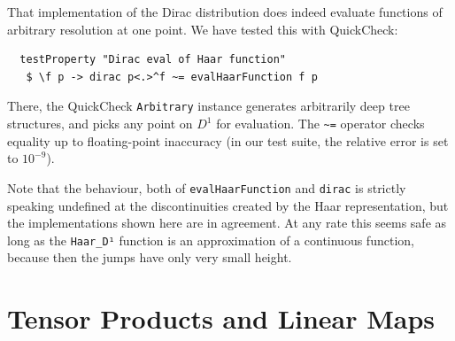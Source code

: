 \documentclass[sigplan,screen]{acmart}
\theoremstyle{acmplain}
\theoremstyle{acmdefinition}
\begin{document}
That implementation of the Dirac distribution does indeed evaluate functions of arbitrary resolution at one point. We have tested this with QuickCheck:
\begin{lstlisting}
  testProperty "Dirac eval of Haar function"
   $ \f p -> dirac p<.>^f ~= evalHaarFunction f p
\end{lstlisting}
There, the QuickCheck \lstinline`Arbitrary` instance generates arbitrarily deep tree structures, and picks any point on $D^1$ for evaluation.
The \lstinline`~=` operator checks equality up to floating-point inaccuracy (in our test suite, the relative error  is set to $10^{-9}$).

Note that the behaviour, both of \verb`evalHaarFunction` and \verb`dirac` is strictly speaking undefined at the discontinuities created by the Haar representation, but the implementations shown here are in agreement. At any rate this seems safe as long as the \verb`Haar_D¹` function is an approximation of a continuous function, because then the jumps have only very small height.

\section{Tensor Products and Linear Maps}
\end{document}
